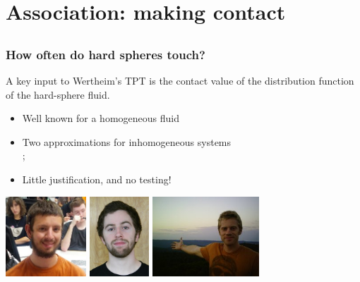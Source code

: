 \section{Association:  making contact}
\subsection*{}

\begin{frame}
  \frametitle{How often do hard spheres touch?}

  \begin{block}{}
  A key input to Wertheim's TPT is the contact value of the
  distribution function of the hard-sphere fluid.
  \begin{itemize}
  \item Well known for a homogeneous fluid
  \item Two approximations for inhomogeneous systems
    \\ \hfill {\tiny ;
    }
  \item Little justification, and no testing!
  \end{itemize}
  \end{block}
  \begin{center}
    \includegraphics[height=3cm]{figs/HaglundChris}
    \includegraphics[height=3cm]{figs/KreitzbergPatrick}
    \includegraphics[height=3cm]{figs/SchulteJeff}
  \end{center}
\end{frame}

